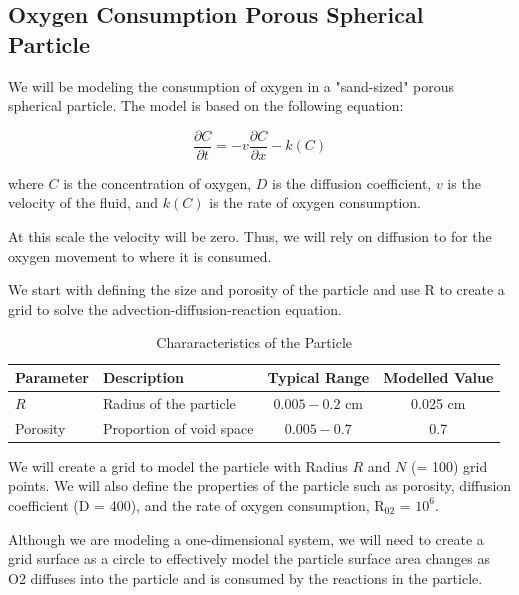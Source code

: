 \documentclass{tufte-handout}\usepackage[]{graphicx}\usepackage[]{xcolor}
\newenvironment{knitrout}{}{} %
\begin{document}
\begin{knitrout}
\end{knitrout}


\subsection{Oxygen Consumption Porous Spherical Particle}

We will be modeling the consumption of oxygen in a "sand-sized" porous spherical particle. The model is based on the following equation:

\[ \frac{\partial C}{\partial t} = -v \frac{\partial C}{\partial x} - k(C) \]

where \( C \) is the concentration of oxygen, \( D \) is the diffusion coefficient, \( v \) is the velocity of the fluid, and \( k(C) \) is the rate of oxygen consumption.

At this scale the velocity will be zero. Thus, we will rely on diffusion to for the oxygen movement to where it is consumed. 



We start with defining the size and porosity of the particle and use R to create a grid to solve the advection-diffusion-reaction equation.

\begin{table}[h]
\caption{Chararacteristics of the Particle}
\centering
\begin{tabular}{|l|l|c|c|} \hline
Parameter & Description & Typical Range &  Modelled Value \\ \hline\hline
\( R \) & Radius of the particle & \( 0.005-0.2 \) cm &  0.025 cm \\
Porosity & Proportion of void space & \(0.005-0.7\) &  0.7 \\ \hline
\end{tabular}
\end{table}

We will create a grid to model the particle with Radius \( R \) and \( N \) (= 100) grid points. We will also define the properties of the particle such as porosity, diffusion coefficient (D = 400), and the rate of oxygen consumption, R$_{02}$ = \ensuremath{10^{6}}.

Although we are modeling a one-dimensional system, we will need to create a grid surface as a circle to effectively model the particle surface area changes as O2 diffuses into the particle and is consumed by the reactions in the particle.
\end{document}
